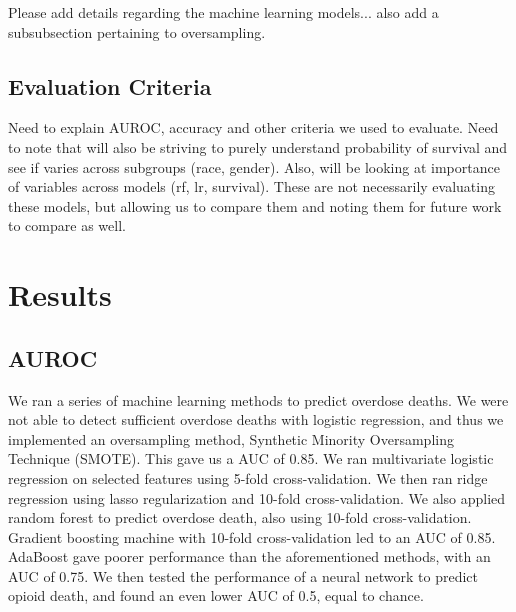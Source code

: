 \documentclass[twoside,10.5pt]{article}
\begin{document}
Please add details regarding the machine learning models... also add a subsubsection pertaining to oversampling.

\subsection{Evaluation Criteria}
Need to explain AUROC, accuracy and other criteria we used to evaluate.
Need to note that will also be striving to purely understand probability of survival and see if varies across subgroups (race, gender). Also, will be looking at importance of variables across models (rf, lr, survival). These are not necessarily evaluating these models, but allowing us to compare them and noting them for future work to compare as well. 

\section{Results}

\subsection{AUROC}
We ran a series of machine learning methods to predict overdose deaths. We were not able to detect sufficient overdose deaths with logistic regression, and thus we implemented an oversampling method, Synthetic Minority Oversampling Technique (SMOTE). This gave us a AUC of 0.85. 
We ran multivariate logistic regression on selected features using 5-fold cross-validation.
We then ran ridge regression using lasso regularization and 10-fold cross-validation.
We also applied random forest to predict overdose death, also using 10-fold cross-validation. 
Gradient boosting machine with 10-fold cross-validation led to an AUC of 0.85.
AdaBoost gave poorer performance than the aforementioned methods, with an AUC of 0.75. We then tested the performance of a neural network to predict opioid death, and found an even lower AUC of 0.5, equal to chance. 
\end{document}
